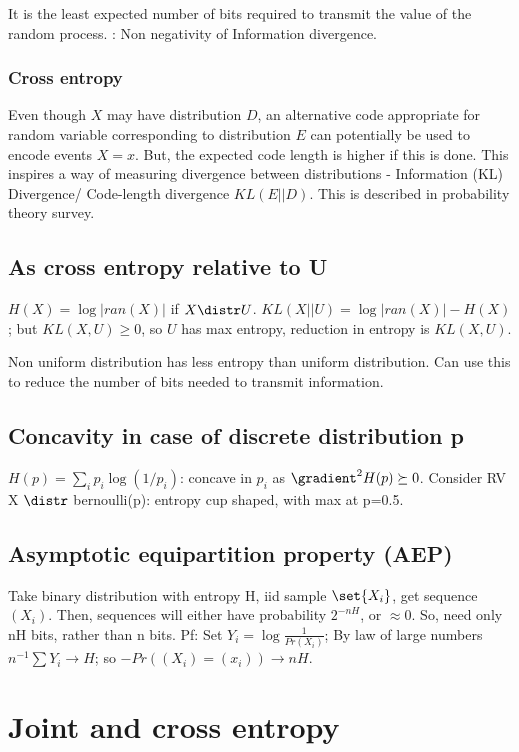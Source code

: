\documentclass[oneside, article]{memoir}
\begin{document}
It is the least expected number of bits required to transmit the value of the random process. \proof: Non negativity of Information divergence.

\subsubsection{Cross entropy}
Even though $X$ may have distribution $D$, an alternative code appropriate for random variable corresponding to distribution $E$ can potentially be used to encode events $X=x$. But, the expected code length is higher if this is done. This inspires a way of measuring divergence between distributions - Information (KL) Divergence/ Code-length divergence $KL(E||D)$. This is described in probability theory survey.

\subsection{As cross entropy relative to U}
$H(X) = \log |ran(X)|$ if $X \distr U$. $KL(X||U) = \log |ran(X)| - H(X)$; but $KL(X,U) \geq 0$, so $U$ has max entropy, reduction in entropy is $KL(X,U)$.

Non uniform distribution has less entropy than uniform distribution. Can use this to reduce the number of bits needed to transmit information.

\subsection{Concavity in case of discrete distribution p}
$H(p) = \sum_i p_i \log(1/p_i)$: concave in $p_i$ as $\gradient^{2} H(p) \succeq 0$. Consider RV X $\distr$ bernoulli(p): entropy cup shaped, with max at p=0.5.

\subsection{Asymptotic equipartition property (AEP)}
Take binary distribution with entropy H, iid sample $\set{X_{i}}$, get sequence $(X_{i})$. Then, sequences will either have probability $2^{-nH}$, or $\approx 0$. So, need only nH bits, rather than n bits. Pf: Set $Y_{i} = \log \frac{1}{Pr(X_{i})}$; By law of large numbers $n^{-1}\sum Y_{i} \to H$; so $-Pr((X_{i}) = (x_{i})) \to nH$.

\section{Joint and cross entropy}
\end{document}

